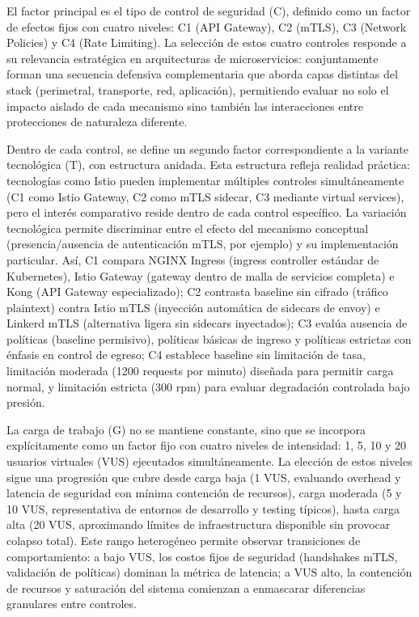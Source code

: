 El factor principal es el tipo de control de seguridad (C), definido como un factor de efectos fijos con cuatro niveles: C1 (API Gateway), C2 (mTLS), C3 (Network Policies) y C4 (Rate Limiting). La selección de estos cuatro controles responde a su relevancia estratégica en arquitecturas de microservicios: conjuntamente forman una secuencia defensiva complementaria que aborda capas distintas del stack (perimetral, transporte, red, aplicación), permitiendo evaluar no solo el impacto aislado de cada mecanismo sino también las interacciones entre protecciones de naturaleza diferente.

Dentro de cada control, se define un segundo factor correspondiente a la variante tecnológica (T), con estructura anidada. Esta estructura refleja realidad práctica: tecnologías como Istio pueden implementar múltiples controles simultáneamente (C1 como Istio Gateway, C2 como mTLS sidecar, C3 mediante virtual services), pero el interés comparativo reside dentro de cada control específico. La variación tecnológica permite discriminar entre el efecto del mecanismo conceptual (presencia/ausencia de autenticación mTLS, por ejemplo) y su implementación particular. Así, C1 compara NGINX Ingress (ingress controller estándar de Kubernetes), Istio Gateway (gateway dentro de malla de servicios completa) e Kong (API Gateway especializado); C2 contrasta baseline sin cifrado (tráfico plaintext) contra Istio mTLS (inyección automática de sidecars de envoy) e Linkerd mTLS (alternativa ligera sin sidecars inyectados); C3 evalúa ausencia de políticas (baseline permisivo), políticas básicas de ingreso y políticas estrictas con énfasis en control de egreso; C4 establece baseline sin limitación de tasa, limitación moderada (1200 requests por minuto) diseñada para permitir carga normal, y limitación estricta (300 rpm) para evaluar degradación controlada bajo presión.

La carga de trabajo (G) no se mantiene constante, sino que se incorpora explícitamente como un factor fijo con cuatro niveles de intensidad: 1, 5, 10 y 20 usuarios virtuales (VUS) ejecutados simultáneamente. La elección de estos niveles sigue una progresión que cubre desde carga baja (1 VUS, evaluando overhead y latencia de seguridad con mínima contención de recursos), carga moderada (5 y 10 VUS, representativa de entornos de desarrollo y testing típicos), hasta carga alta (20 VUS, aproximando límites de infraestructura disponible sin provocar colapso total). Este rango heterogéneo permite observar transiciones de comportamiento: a bajo VUS, los costos fijos de seguridad (handshakes mTLS, validación de políticas) dominan la métrica de latencia; a VUS alto, la contención de recursos y saturación del sistema comienzan a enmascarar diferencias granulares entre controles.

